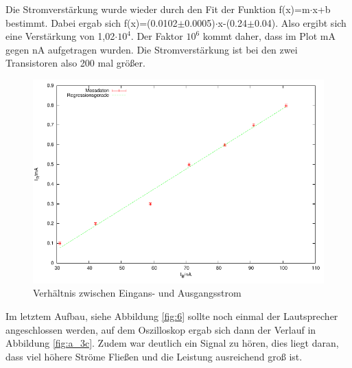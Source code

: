 \documentclass[12pt,a4paper]{article}
\begin{document}
Die Stromverstärkung wurde wieder durch den Fit der Funktion f(x)=m$\cdot$x+b bestimmt. Dabei ergab sich f(x)=(0.0102$\pm$0.0005)$\cdot$x-(0.24$\pm$0.04). Also ergibt sich eine Verstärkung von 1,02$\cdot10^4$. Der Faktor $10^6$ kommt daher, dass im Plot mA gegen nA aufgetragen wurden. Die Stromverstärkung ist bei den zwei Transistoren also 200 mal größer.


\begin{figure}[H] 
  \centering
    \includegraphics[scale = 0.7]{a_3b_i.pdf}
  	\caption[Verhältnis zwischen Eingans- und Ausgangsstrom]{Verhältnis zwischen Eingans- und Ausgangsstrom}
  \label{fig:a_3b_i}
\end{figure}

Im letztem Aufbau, siehe Abbildung \ref{fig:6} sollte noch einmal der Lautsprecher angeschlossen werden, auf dem Oszilloskop ergab sich dann der Verlauf in Abbildung \ref{fig:a_3c}. Zudem war deutlich ein Signal zu hören, dies liegt daran, dass viel höhere Ströme Fließen und die Leistung ausreichend groß ist.
\end{document}
